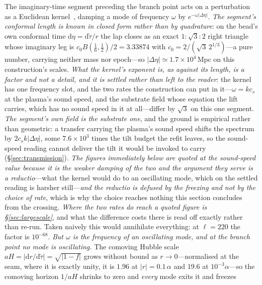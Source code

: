 \documentclass[11pt,a4paper]{article}
\theoremstyle{plain}
\theoremstyle{definition}
\theoremstyle{remark}
\newcommand{\dd}{\mathrm{d}}   %
\begin{document}
The imaginary-time segment preceding the branch point acts on a perturbation as a Euclidean
kernel~\cite{JanzenCanonicalTime}, damping a mode of frequency $\omega$ by
$e^{-\omega\lvert\Delta\eta\rvert}$. \emph{The segment's conformal length is known in closed form rather than
by quadrature}: on the bead's own conformal time $\dd\eta=\dd\tilde\tau/r$ the lap closes as an exact
$1:\sqrt3:2$ right triangle whose imaginary leg is $c_{0}B(\tfrac16,\tfrac12)/2=3.33874$ with
$c_{0}=2/(\sqrt3\,2^{1/3})$---a pure number, carrying neither mass nor epoch---so
$\lvert\Delta\eta\rvert\simeq1.7\times10^{4}\,\mathrm{Mpc}$ on this construction's
scales.
\emph{What the kernel's exponent is, as against its length, is a factor and not a detail, and it is settled
rather than left to the reader}: the kernel has one frequency slot, and the two rates the construction can put
in it---$\omega=kc_{s}$ at the plasma's sound speed, and the substrate field whose equation the lift carries,
which has no sound speed in it at all---differ by $\sqrt3$ on this one segment. \emph{The segment's own field
is the substrate one}, and the ground is empirical rather than geometric: a transfer carrying the plasma's
sound speed shifts the spectrum by $2c_{s}k\lvert\Delta\eta\rvert$, some $7.6\times10^{3}$ times the tilt
budget the refit leaves, so the sound-speed reading cannot deliver the tilt it would be invoked to carry
(\S\ref{sec:transmission}). \emph{The figures immediately below are quoted at the sound-speed value because it is the weaker damping of
the two and the argument they serve is a reductio}---what the kernel would do to an oscillating mode, which
on the settled reading is harsher still---\emph{and the reductio is defused by the freezing and not by the
choice of rate}, which is why the choice reaches nothing this section concludes from the crossing.
\emph{Where the two rates do reach a quoted figure is \S\ref{sec:largescale}}, and what the difference costs
there is read off exactly rather than re-run. Taken
naively this would annihilate everything: at $\ell=220$ the factor is $10^{-68}$. \emph{But $\omega$ is the
frequency of an \emph{oscillating} mode, and at the branch point no mode is oscillating.} The comoving Hubble
scale $aH=\lvert\dd r/\dd\tilde\tau\rvert=\sqrt{\lvert 1-f\rvert}$ grows without bound as $r\to0$---normalised
at the seam, where it is exactly unity, it is $1.96$ at $\lvert r\rvert=0.1\,\alpha$ and $19.6$ at
$10^{-3}\alpha$---so the comoving horizon $1/aH$ shrinks to zero and \emph{every} mode exits it and freezes
\end{document}

